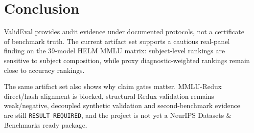 \section{Conclusion}

ValidEval provides audit evidence under documented protocols, not a certificate of benchmark truth.
The current artifact set supports a cautious real-panel finding on the 39-model HELM MMLU matrix:
subject-level rankings are sensitive to subject composition, while proxy diagnostic-weighted
rankings remain close to accuracy rankings.

The same artifact set also shows why claim gates matter. MMLU-Redux direct/hash alignment is
blocked, structural Redux validation remains weak/negative, decoupled synthetic validation and
second-benchmark evidence are still \texttt{RESULT\_REQUIRED}, and the project is not yet a NeurIPS
Datasets \& Benchmarks ready package.
